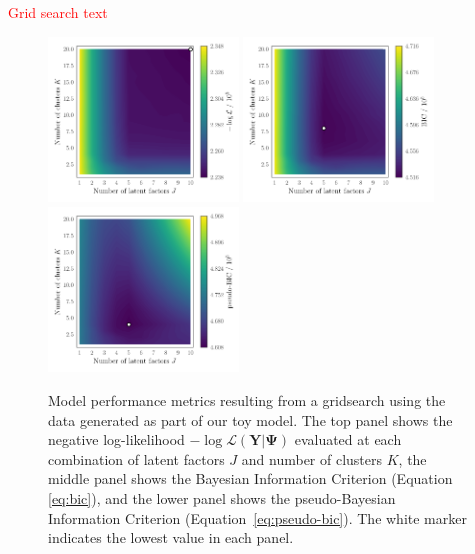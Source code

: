 \documentclass[twocolumn]{aastex61}
\newcommand{\todo}[1]{\textcolor{red}{#1}}
\newcommand{\vect}[1]{\boldsymbol{\mathbf{#1}}}
\renewcommand{\vec}[1]{\vect{#1}}
\newcommand{\data}{\textbf{Y}}
\begin{document}
\todo{Grid search text}



\begin{figure}
	\includegraphics[width=0.45\textwidth]{experiments/toy-ll-contours.png}
	\includegraphics[width=0.45\textwidth]{experiments/toy-bic-contours.png}
	\includegraphics[width=0.45\textwidth]{experiments/toy-pseudobic-contours.png}
    \caption{Model performance metrics resulting from a gridsearch using the
    		 data generated as part of our toy model. The top 
		 	 panel shows the negative log-likelihood 
			 $-\log{\mathcal{L}\left(\data|\vec\Psi\right)}$ 
			 evaluated at each combination of latent factors $J$ and number 
			 of clusters $K$, the middle panel shows the Bayesian Information
			 Criterion (Equation \ref{eq:bic}), and the lower panel shows
			 the pseudo-Bayesian Information Criterion 
			 (Equation~\ref{eq:pseudo-bic}). The white marker indicates the 
			 lowest value in each panel.}
    \label{fig:experiment-1-gridsearch}
\end{figure}
\end{document}
